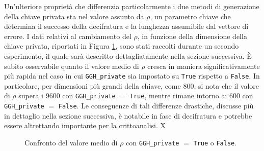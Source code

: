 Un'ulteriore proprietà che differenzia particolarmente i due metodi di generazione della 
chiave privata sta nel valore assunto da $\rho$, un parametro chiave che determina il 
successo della decifratura e la lunghezza assumibile dal vettore di errore. 
I dati relativi al cambiamento del $\rho$, in funzione della dimensione della chiave privata, riportati in 
Figura \ref{fig:rho_comparison}, sono stati raccolti durante un secondo esperimento, 
il quale sarà descritto dettagliatamente nella sezione successiva. 
È subito osservabile quanto il valore medio di $\rho$ cresca in maniera significativamente 
più rapida nel caso in cui \texttt{GGH\_private} sia impostato su \texttt{True} rispetto a 
\texttt{False}. In particolare, per dimensioni più grandi della chiave, come 800, si nota 
che il valore di $\rho$ supera i 9600 con \texttt{GGH\_private} $=$ \texttt{True}, mentre 
rimane intorno ai 600 con \texttt{GGH\_private} $=$ \texttt{False}. Le conseguenze di 
tali differenze drastiche, discusse più in dettaglio nella sezione successiva, è notabile 
in fase di decifratura e potrebbe essere altrettando importante per la crittoanalisi. X


\begin{figure}[H]
    \centering
    \pgfplotsset{scaled y ticks=false}
    \caption{Confronto del valore medio di $\rho$ con \texttt{GGH\_private} $=$ \texttt{True} o \texttt{False}.}
    \label{fig:rho_comparison}
\end{figure}


